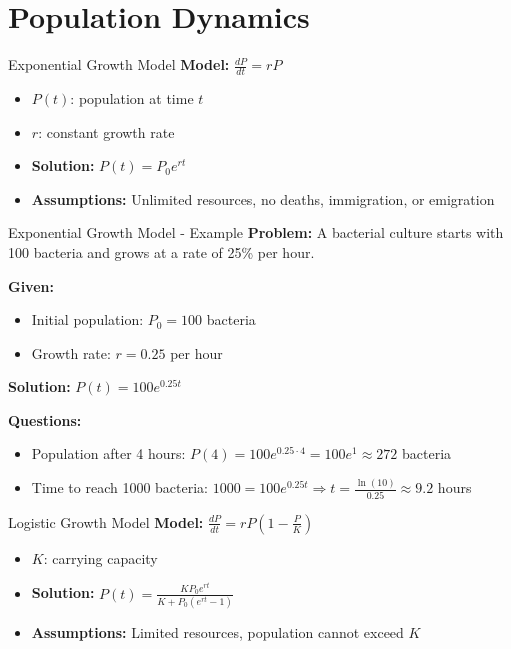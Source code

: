 \documentclass[10pt,aspectratio=169]{beamer}
\begin{document}
\section{Population Dynamics}
\begin{frame}{Exponential Growth Model}
    \textbf{Model:} $\frac{dP}{dt} = rP$
    \begin{itemize}
        \item $P(t)$: population at time $t$
        \item $r$: constant growth rate
        \item \textbf{Solution:} $P(t) = P_0 e^{rt}$
        \item \textbf{Assumptions:} Unlimited resources, no deaths, immigration, or emigration
    \end{itemize}
\end{frame}

\begin{frame}{Exponential Growth Model - Example}
    \textbf{Problem:} A bacterial culture starts with 100 bacteria and grows at a rate of 25\% per hour.
    
    \vspace{0.3cm}
    \textbf{Given:}
    \begin{itemize}
        \item Initial population: $P_0 = 100$ bacteria
        \item Growth rate: $r = 0.25$ per hour
    \end{itemize}
    
    \vspace{0.3cm}
    \textbf{Solution:} $P(t) = 100e^{0.25t}$
    
    \vspace{0.3cm}
    \textbf{Questions:}
    \begin{itemize}
        \item Population after 4 hours: $P(4) = 100e^{0.25 \cdot 4} = 100e^1 \approx 272$ bacteria
        \item Time to reach 1000 bacteria: $1000 = 100e^{0.25t} \Rightarrow t = \frac{\ln(10)}{0.25} \approx 9.2$ hours
    \end{itemize}
\end{frame}

\begin{frame}{Logistic Growth Model}
    \textbf{Model:} $\frac{dP}{dt} = rP\left(1-\frac{P}{K}\right)$
    \begin{itemize}
        \item $K$: carrying capacity
        \item \textbf{Solution:} $P(t) = \frac{KP_0 e^{rt}}{K + P_0 (e^{rt} - 1)}$
        \item \textbf{Assumptions:} Limited resources, population cannot exceed $K$
    \end{itemize}
\end{frame}
\end{document}

